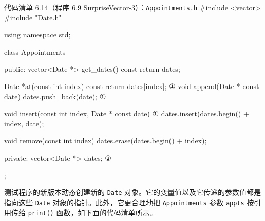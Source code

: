 \begin{codeboxt}{代码清单 6.14（程序 6.9 SurpriseVector-3）：\texttt{Appointments.\allowbreak{}h}}
#include <vector>
#include "Date.h"

using namespace std;

class Appointments
{
public:
    vector<Date *> get_dates() const { return dates; }

    Date *at(const int index) const { return dates[index]; }      ①
    void append(Date * const date)  { dates.push_back(date); }    ①

    void insert(const int index, Date * const date)               ①
    {
        dates.insert(dates.begin() + index, date);
    }

    void remove(const int index)    
    { 
        dates.erase(dates.begin() + index); 
    }

private:
    vector<Date *> dates;                                         ②
};
\end{codeboxt}
\par
{}\par

测试程序的新版本动态创建新的 \texttt{Date} 对象。它的变量值以及它传递的参数值都是指向这些 \texttt{Date} 对象的指针。此外，它更合理地把 \texttt{Appointments} 参数 \texttt{appts} 按引用传给 \texttt{print()} 函数，如下面的代码清单所示。


